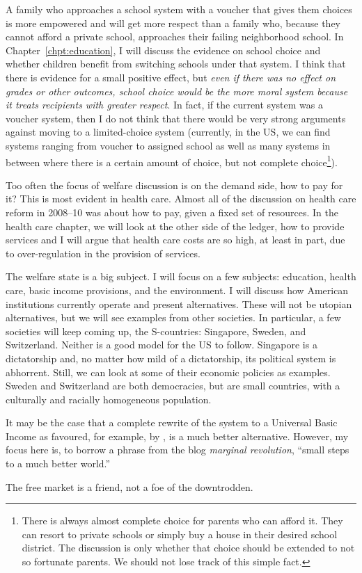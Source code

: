 A family who approaches a school system with a voucher that gives them choices
is more empowered and will get more respect than a family who, because they
cannot afford a private school, approaches their failing neighborhood school.
In Chapter~\ref{chpt:education}, I will discuss the evidence on school choice
and whether children benefit from switching schools under that system. I think
that there is evidence for a small positive effect, but \emph{even if there was
no effect on grades or other outcomes, school choice would be the more moral
system because it treats recipients with greater respect}. In fact, if the
current system was a voucher system, then I do not think that there would be
very strong arguments against moving to a limited-choice system (currently, in
the US, we can find systems ranging from voucher to assigned school as well as
many systems in between where there is a certain amount of choice, but not
complete choice\footnote{There is always almost complete choice for parents who
can afford it. They can resort to private schools or simply buy a house in
their desired school district. The discussion is only whether that choice
should be extended to not so fortunate parents. We should not lose track of
this simple fact.}).

Too often the focus of welfare discussion is on the demand side, how to pay for
it? This is most evident in health care. Almost all of the discussion on health
care reform in 2008--10 was about how to pay, given a fixed set of resources.
In the health care chapter, we will look at the other side of the ledger, how
to provide services and I will argue that health care costs are so high, at
least in part, due to over-regulation in the provision of services.

The welfare state is a big subject. I will focus on a few subjects: education,
health care, basic income provisions, and the environment. I will discuss how
American institutions currently operate and present alternatives. These will
not be utopian alternatives, but we will see examples from other societies. In
particular, a few societies will keep coming up, the S-countries: Singapore,
Sweden, and Switzerland. Neither is a good model for the US to follow.
Singapore is a dictatorship and, no matter how mild of a dictatorship, its
political system is abhorrent. Still, we can look at some of their economic
policies as examples. Sweden and Switzerland are both democracies, but are
small countries, with a culturally and racially homogeneous population.

It may be the case that a complete rewrite of the system to a Universal Basic
Income as favoured, for example, by \citet{MurrayUBI}, is a much better
alternative. However, my focus here is, to borrow a phrase from the blog
\emph{marginal revolution}, ``small steps to a much better world.''

The free market is a friend, not a foe of the downtrodden.


